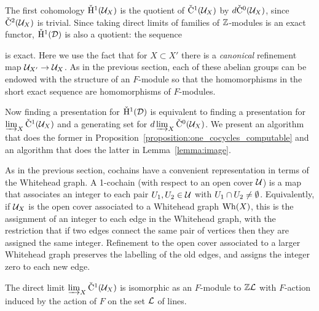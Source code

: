 The first cohomology $\check{\mathrm{H}}{}^1(\mathcal{U}_X)$ is the quotient of $\check{\mathrm{C}}{}^1(\mathcal{U}_X)$ by $d\check{\mathrm{C}}{}^0(\mathcal{U}_X)$, since $\check{\mathrm{C}}{}^2(\mathcal{U}_X)$ is trivial.
Since taking direct limits of families of $\mathbb{Z}$-modules is an exact functor, $\check{\mathrm{H}}{}^1(\mathcal{D})$ is also a quotient: the sequence
\begin{center}\end{center}
is exact.
Here we use the fact that for $X \subset X'$ there is a \emph{canonical} refinement map $\mathcal{U}_{X'} \to \mathcal{U}_X$.
As in the previous section, each of these abelian groups can be endowed with the structure of an $F$-module so that the homomorphisms in the short exact sequence are homomorphisms of $F$-modules.

Now finding a presentation for $\check{\mathrm{H}}{}^1(\mathcal{D})$ is equivalent to finding a presentation for $\varinjlim_X \check{\mathrm{C}}^1( \mathcal{U}_X)$ and a generating set for $d\varinjlim_X\check{\mathrm{C}}{}^0(\mathcal{U}_X)$.
We present an algorithm that does the former in Proposition~\ref{proposition:one_cocycles_computable} and an algorithm that does the latter in Lemma~\ref{lemma:image}.

As in the previous section, cochains have a convenient representation in terms of the Whitehead graph.
A 1-cochain (with respect to an open cover $\mathcal{U}$) is a map that associates an integer to each pair $U_1, U_2 \in \mathcal{U}$ with $U_1 \cap U_2 \neq \emptyset$.
Equivalently, if $\mathcal{U}_X$ is the open cover associated to a Whitehead graph $\mathrm{Wh}(X)$, this is the assignment of an integer to each edge in the Whitehead graph, with the restriction that if two edges connect the same pair of vertices then they are assigned the same integer.
Refinement to the open cover associated to a larger Whitehead graph preserves the labelling of the old edges, and assigns the integer zero to each new edge.

\begin{proposition}\label{proposition:one_cocycles_computable}
  The direct limit\/ $\varinjlim_X\check{\mathrm{C}}{}^1(\mathcal{U}_X)$ is isomorphic as an $F$-module to $\mathbb{Z}\mathcal{L}$ with $F$-action induced by the action of $F$ on the set $\mathcal{L}$ of lines.
\end{proposition}

